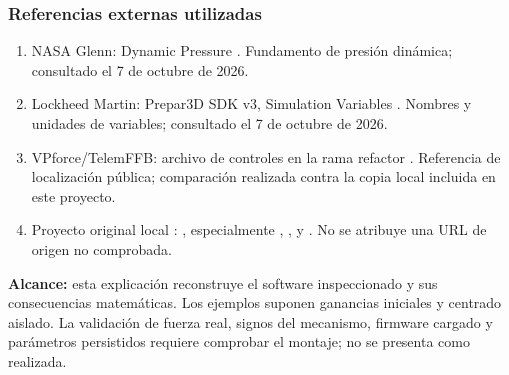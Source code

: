 \subsubsection{Referencias externas utilizadas}
\begin{enumerate}
\item NASA Glenn: Dynamic Pressure \cite{nasaq}. Fundamento de presión dinámica; consultado el 7 de octubre de 2026.
\item Lockheed Martin: Prepar3D SDK v3, Simulation Variables \cite{p3dv3}. Nombres y unidades de variables; consultado el 7 de octubre de 2026.
\item VPforce/TelemFFB: archivo de controles en la rama refactor \cite{telemffb}. Referencia de localización pública; comparación realizada contra la copia local incluida en este proyecto.
\item Proyecto original local \cite{yokealeman}: , especialmente , ,  y . No se atribuye una URL de origen no comprobada.
\end{enumerate}

\textbf{Alcance:} esta explicación reconstruye el software inspeccionado y sus consecuencias matemáticas. Los ejemplos suponen ganancias iniciales y centrado aislado. La validación de fuerza real, signos del mecanismo, firmware cargado y parámetros persistidos requiere comprobar el montaje; no se presenta como realizada.
\newpage
